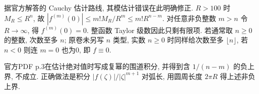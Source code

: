 \begin{solution}
据官方解答的 Cauchy 估计路线, 其模估计错误在此明确修正. $R>100$ 时 $M_R\le R^n$, 故 $|f^{(m)}(0)|\le m!M_R/R^m\le m!R^{n-m}$. 对任意非负整数 $m>n$ 令 $R\to\infty$, 得 $f^{(m)}(0)=0$. 整函数 Taylor 级数因此只剩有限项. 若通常取 $n\ge0$ 的整数, 次数至多 $n$; 原卷未另写 $n$ 类型, 实数 $n\ge0$ 时同样给次数至多 $\lfloor n\rfloor$, 若 $n<0$ 则连 $m=0$ 也为0, 即 $f\equiv0$.

官方PDF p.3在估计绝对值时写成复幂的围道积分, 并得到含 $1/(n-m)$ 的负上界, 不成立. 正确做法是积分 $|f(\zeta)|/|\zeta|^{m+1}$ 对弧长, 用圆周长度 $2\pi R$ 得上述非负上界.
\end{solution}
